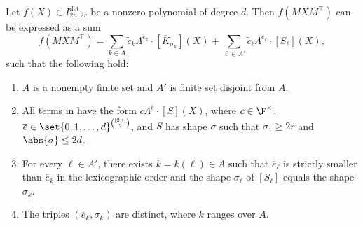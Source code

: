 \documentclass[letterpaper, 11pt]{amsart}
\begin{document}
\begin{lem}\label{lem:pfaffian_leading_terms_NEW}
Let $f(X) \in I^{\det}_{2n, 2r}$ be a nonzero polynomial of degree $d$.
Then $f(MXM^\top)$ can be expressed as a sum
\begin{equation}\label{eq:expansion1_pfaff}
    f(MXM^\top) = \sum_{k \in A} \widetilde{c}_{k} \Lambda^{\overline{e}_k}\cdot [\overline{K}_{\sigma_k}](X) + \sum_{\ell\in A'} \widetilde{c}_{\ell} \Lambda^{\overline{e}_\ell}\cdot [S_\ell](X),
\end{equation}
such that the following hold:
\begin{enumerate}
    \item\label{item:expansion1_i0_pfaff} $A$ is a nonempty finite set and $A'$ is finite set disjoint from $A$.
    \item\label{item:expansion1_i1_pfaff} All terms in  have the form $c \Lambda^{\overline{e}}\cdot [S](X)$, where $c\in \F^\times$, $\overline{e}\in \set{0, 1, \dots, d}^{\binom{[2n]}{2}}$, and $S$ has shape $\sigma$ such that $\sigma_1 \geq 2r$ and $\abs{\sigma} \leq 2d$.
    \item\label{item:expansion1_i1.5_pfaff} For every $\ell\in A'$, there exists $k=k(\ell)\in A$ such that $\overline{e}_\ell$ is strictly smaller than $\overline{e}_k$ in the lexicographic order and the shape $\sigma_\ell$ of $[S_\ell]$ equals the shape $\sigma_k$.
    \item\label{item:expansion1_i2_pfaff} The triples $(\overline{e}_k,\sigma_k)$ are distinct, where $k$ ranges over $A$.
\end{enumerate} 
\end{lem}
\end{document}

